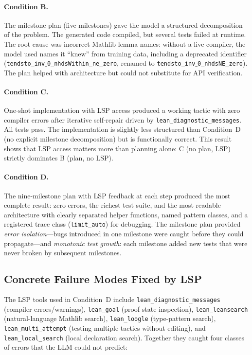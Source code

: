 \documentclass{llncs}
\begin{document}
\paragraph{Condition B.}
The milestone plan (five milestones) gave the model a structured decomposition
of the problem. The generated code compiled, but several tests failed at
runtime. The root cause was incorrect Mathlib lemma names: without a live
compiler, the model used names it ``knew'' from training data, including a
deprecated identifier
(\texttt{tendsto\_inv$\text{\_}$0\_nhdsWithin\_ne\_zero}, renamed to
\texttt{tendsto\_inv$\text{\_}$0\_nhdsNE\_zero}).
The plan helped with architecture but could not substitute for API verification.

\paragraph{Condition C.}
One-shot implementation with LSP access produced a working tactic with zero
compiler errors after iterative self-repair driven by \texttt{lean\_diagnostic\_messages}.
All tests pass.  The implementation is slightly less structured than
Condition~D (no explicit milestone decomposition) but is functionally correct.
This result shows that LSP access matters more than planning alone:
C (no plan, LSP) strictly dominates B (plan, no LSP).

\paragraph{Condition D.}
The nine-milestone plan with LSP feedback at each step produced the most
complete result: zero errors, the richest test suite, and the most readable
architecture with clearly separated helper functions, named pattern classes,
and a registered trace class (\texttt{limit\_auto}) for debugging.
The milestone plan provided \emph{error isolation}---bugs introduced in one
milestone were caught before they could propagate---and \emph{monotonic test growth}:
each milestone added new tests that were never broken by subsequent milestones.

\subsection{Concrete Failure Modes Fixed by LSP}
\label{sec:failures}

The LSP tools used in Condition~D include
\texttt{lean\_diagnostic\_messages} (compiler errors/warnings),
\texttt{lean\_goal} (proof state inspection),
\texttt{lean\_leansearch} (natural-language Mathlib search),
\texttt{lean\_loogle} (type-pattern search),
\texttt{lean\_multi\_attempt} (testing multiple tactics without editing),
and \texttt{lean\_local\_search} (local declaration search).
Together they caught four classes of errors that the LLM could not predict:
\end{document}
